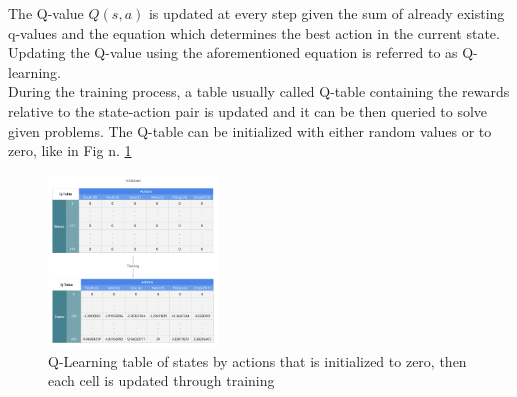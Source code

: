 \documentclass[conference]{IEEEtran}
\begin{document}
The Q-value $Q(s,a)$ is updated at every step given the sum of already existing q-values and the equation which determines the best action in the current state. Updating the Q-value using the aforementioned equation is referred to as Q-learning\cite{Q_learning}.\\
During the training process, a table usually called Q-table containing the rewards relative to the state-action pair is updated and it can be then queried to solve given problems. The Q-table can be initialized with either random values or to zero, like in Fig n. \ref{fig:q_table}
\begin{figure}[htb]
    \centering
    \includegraphics[width=0.4\textwidth]{img/Q-Learning_Matrix_Initialized_and_After_Training.png}
    \caption{Q-Learning table of states by actions that is initialized to zero, then each cell is updated through training\cite{enwiki:1054401845} 
    } 
    \label{fig:q_table}
\end{figure}
\end{document}
